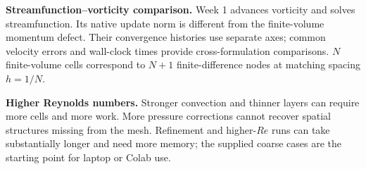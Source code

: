 \textbf{Streamfunction--vorticity comparison.} Week 1 advances vorticity and solves streamfunction. Its native update norm is different from the finite-volume momentum defect. Their convergence histories use separate axes; common velocity errors and wall-clock times provide cross-formulation comparisons. $N$ finite-volume cells correspond to $N+1$ finite-difference nodes at matching spacing $h=1/N$.

\textbf{Higher Reynolds numbers.} Stronger convection and thinner layers can require more cells and more work. More pressure corrections cannot recover spatial structures missing from the mesh. Refinement and higher-$Re$ runs can take substantially longer and need more memory; the supplied coarse cases are the starting point for laptop or Colab use.
